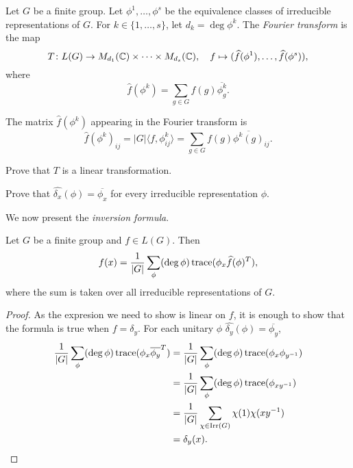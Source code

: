 \begin{definition}
  Let $G$ be a finite group. Let $\phi^1,\dots,\phi^s$ be the equivalence classes 
  of irreducible representations of $G$. For $k\in\{1,\dots,s\}$, let 
  $d_k=\deg\phi^k$. 
  The \emph{Fourier transform} is the map  
  \[
    T\colon L(G)\to M_{d_1}(\mathbb{C})\times\cdots\times M_{d_s}(\mathbb{C}),
    \quad
    f\mapsto (\widehat{f}(\phi^1),\dots,\widehat{f}(\phi^s)),
  \]
  where  
  \[
    \widehat{f}(\phi^k)=\sum_{g\in G}f(g)\overline{\phi_g^k}.
  \]
\end{definition}

The matrix 
  $\widehat{f}(\phi^k)$ appearing in the Fourier transform is 
  \[
    \widehat{f}(\phi^k)_{ij}=|G|\langle f,\phi_{ij}^k\rangle=\sum_{g\in G}f(g)\overline{\phi^k(g)}_{ij}.
  \]


\begin{exercise}
  \label{xca:Tlineal}
  Prove that $T$ is a linear transformation. 
\end{exercise}

\begin{exercise}
  Prove that $\widehat{\delta_x}(\phi)=\overline{\phi_x}$ for every
  irreducible representation $\phi$.  
\end{exercise}

We now present the \emph{inversion formula}. 

\begin{theorem}
  \label{thm:inversion}
  Let $G$ be a finite group and $f\in L(G)$. Then 
  \[
    f(x)=\frac{1}{|G|}\sum_{\phi}(\deg\phi)\operatorname{trace}(\phi_x \widehat{f}(\phi)^T),
  \]
  where the sum is taken over all irreducible representations of $G$. 
\end{theorem}

\begin{proof}
  As the expresion we need to show is linear on $f$, it is enough to 
  show that the formula is true when 
  $f=\delta_y$. For each unitary $\phi$  
  $\widehat{\delta_y}(\phi)=\overline{\phi_y}$, 
  \begin{align*}
    \frac{1}{|G|}\sum_{\phi}(\deg\phi)\operatorname{trace}(\phi_x\overline{\phi_y}^T)
    &=\frac{1}{|G|}\sum_{\phi}(\deg\phi)\operatorname{trace}(\phi_x\phi_{y^{-1}})\\
    &=\frac{1}{|G|}\sum_{\phi}(\deg\phi)\operatorname{trace}(\phi_{xy^{-1}})\\
    &=\frac{1}{|G|}\sum_{\chi\in\operatorname{Irr}(G)}\chi(1)\chi(xy^{-1})\\
    &=\delta_y(x).\qedhere 
  \end{align*}
\end{proof}

